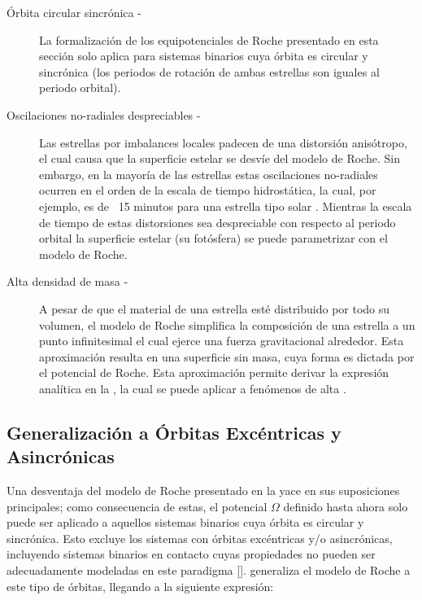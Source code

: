 \begin{description}
	\item[Órbita circular sincrónica -] La formalización de los equipotenciales
	de Roche presentado en esta sección solo aplica para sistemas binarios cuya
	órbita es circular y sincrónica (los periodos de rotación de ambas estrellas
	son iguales al periodo orbital). 
	
	\item[Oscilaciones no-radiales despreciables -]  Las estrellas por
	imbalances locales padecen de una distorsión anisótropo, el cual causa que
	la superficie estelar se desvíe del modelo de Roche. Sin embargo, en la
	mayoría de las estrellas estas oscilaciones no-radiales ocurren en el orden
	de la escala de tiempo hidrostática, la cual, por ejemplo, es de ~15 minutos
	para una estrella tipo solar
	. Mientras
	la escala de tiempo de estas distorsiones sea despreciable con respecto al
	periodo orbital la superficie estelar (su fotósfera) se puede parametrizar
	con el modelo de Roche.

	\item[Alta densidad de masa -] A pesar de que el material de una estrella
	esté distribuido por todo su volumen, el modelo de Roche simplifica la
	composición de una estrella a un punto infinitesimal el cual ejerce una
	fuerza gravitacional alrededor. Esta aproximación resulta en una superficie
	sin masa, cuya forma es dictada por el potencial de Roche. Esta aproximación
	permite derivar la expresión analítica en la , la
	cual se puede aplicar a fenómenos de alta 
	.
\end{description}

\subsection{Generalización a Órbitas Excéntricas y Asincrónicas}

Una desventaja del modelo de Roche presentado en la 
yace en sus suposiciones principales; como consecuencia de estas, el potencial
$\Omega$ definido hasta ahora solo puede ser aplicado a aquellos sistemas
binarios cuya órbita es circular y sincrónica. Esto excluye los sistemas con
órbitas excéntricas y/o asincrónicas, incluyendo sistemas binarios en contacto
cuyas propiedades no pueden ser adecuadamente modeladas en este paradigma
[].
 generaliza el modelo de Roche a este tipo de
órbitas, llegando a la siguiente expresión:

